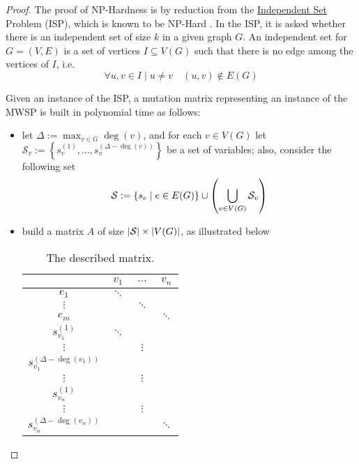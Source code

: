 \begin{proof}
    The proof of NP-Hardness is by reduction from the \href{https://en.wikipedia.org/wiki/Independent_set_(graph_theory)}{Independent Set} Problem (ISP), which is known to be NP-Hard \cite{hochbaum}. In the ISP, it is asked whether there is an independent set of size $k$ in a given graph $G$. An independent set for $G = (V, E)$ is a set of vertices $I \subseteq V(G)$ such that there is no edge among the vertices of $I$, i.e. $$\forall u, v \in I \mid u \neq v \quad (u, v) \notin E(G)$$

    Given an instance of the ISP, a mutation matrix representing an instance of the MWSP is built in polynomial time as follows:

    \begin{itemize}
        \item let $\Delta := \max_{v \in G}{\deg(v)}$, and for each $v \in V(G)$ let $\mathcal S_v := \left\{s_v^{(1)}, \ldots, s_v^{(\Delta - \deg(v))}\right\}$ be a set of variables; also, consider the following set $$\mathcal S := \left\{s_e \mid e \in E(G)\right\} \cup \left(\bigcup_{v \in V(G)}{\mathcal S_v}\right)$$
        \item build a matrix $A$ of size $\left|\mathcal S\right| \times \left|V(G)\right|$, as illustrated below

            \begin{table}[H]
                \centering
                \begin{tabular}{c|ccc}
                          & $v_1$ & $\ldots$ & $v_n$ \\
                    \hline
                    $e_1$ & $\ddots$ & & \\
                    $\vdots$ & & $\ddots$ & \\
                    $e_m$ & & & $\ddots$ \\
                    \hline
                    $s_{v_1}^{(1)}$ & $\ddots$ & & \\
                    $\vdots$ & & $\vdots$ & \\
                    $s_{v_1}^{(\Delta - \deg(v_1))}$ & &  & \\
                    $\vdots$ & & $\vdots$ & \\
                    $s_{v_n}^{(1)}$ & &  & \\
                    $\vdots$ & & $\vdots$ & \\
                    $s_{v_n}^{(\Delta - \deg(v_n))}$ & & & $\ddots$
                \end{tabular}
                \caption{The described matrix.}
            \end{table}


\end{itemize}
\end{proof}
